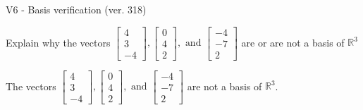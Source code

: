 \begin{exercise}
  \begin{exerciseTitle}V6 - Basis verification (ver. 318)\end{exerciseTitle}
  \begin{exerciseStatement}
    Explain why the vectors \(\left[\begin{array}{r}
4 \\
3 \\
-4
\end{array}\right] , \left[\begin{array}{r}
0 \\
4 \\
2
\end{array}\right] , \text{ and } \left[\begin{array}{r}
-4 \\
-7 \\
2
\end{array}\right]\) are or are not a basis of \(\mathbb{R}^3\)	


  \end{exerciseStatement}
  \begin{exerciseAnswer}
   The vectors \(\left[\begin{array}{r}
4 \\
3 \\
-4
\end{array}\right] , \left[\begin{array}{r}
0 \\
4 \\
2
\end{array}\right] , \text{ and } \left[\begin{array}{r}
-4 \\
-7 \\
2
\end{array}\right]\) 
  	 are not  a basis of \(\mathbb{R}^3\).
  


  \end{exerciseAnswer}
\end{exercise}